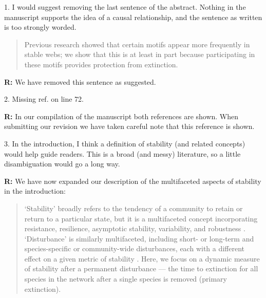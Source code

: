 \documentclass[12pt]{article}
\begin{document}
    1. I would suggest removing the last sentence of the abstract. Nothing in the manuscript supports the idea of a causal relationship, and the sentence as written is too strongly worded.

    \begin{quotation}
      Previous research showed that certain motifs appear more frequently in stable webs; we show that this is at least in part because participating in these motifs provides protection from extinction.
    \end{quotation}

    \smallskip

    \textbf{R:} We have removed this sentence as suggested.

    \smallskip

    2. Missing ref. on line 72.


    \smallskip

    \textbf{R:} In our compilation of the manuscript both references are shown. When submitting our revision we have taken careful note that this reference is shown.

    \smallskip

    3. In the introduction, I think a definition of stability (and related concepts) would help guide readers. This is a broad (and messy) literature, so a little disambiguation would go a long way.

    \smallskip

    \textbf{R:} We have now expanded our description of the multifaceted aspects of stability in the introduction:
    
    \begin{quotation}
    `Stability' broadly refers to the tendency of a community to retain or return to a particular state, but it is a multifaceted concept incorporating resistance, resilience, asymptotic stability, variability, and robustness \citep{Donohue2013}. `Disturbance' is similarly multifaceted, including short- or long-term and species-specific or community-wide disturbances, each with a different effect on a given metric of stability \citep{Donohue2013,Radchuck2019}.
    Here, we focus on a dynamic measure of stability after a permanent disturbance --- the time to extinction for all species in the network after a single species is removed (primary extinction).
    \end{quotation}
    
\end{document}
